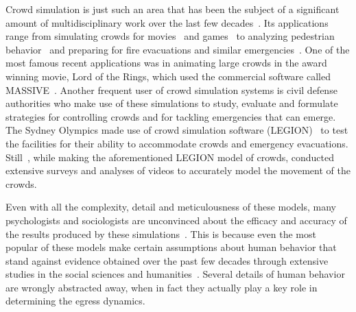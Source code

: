 Crowd simulation is just such an area that has been the subject of a significant amount of multidisciplinary work over the last few decades~\cite{Still:2000tp,Zhou:2010:CMS:1842722.1842725,Gwynne1999741}. Its applications range from simulating crowds for movies~\cite{Regelous:2011vt,Reynolds:1987vm} and games~\cite{Snape:2012,ageOfEmpires:2013} to analyzing pedestrian behavior~\cite{PhysRevE.51.4282,Viswanathan:ut,Guy:2010uv} and preparing for fire evacuations and similar emergencies~\cite{Klupfel:2005to,PEDFull:2011,Mordvintsev:2012}. One of the most famous recent applications was in animating large crowds in the award winning movie, Lord of the Rings, which used the commercial software called MASSIVE~\cite{Regelous:2011vt}. Another frequent user of crowd simulation systems is civil defense authorities who make use of these simulations to study, evaluate and formulate strategies for controlling crowds and for tackling emergencies that can emerge. The Sydney Olympics made use of crowd simulation software (LEGION)~\cite{Still:2000tp} to test the facilities for their ability to accommodate crowds and emergency evacuations. Still~\cite{Still:2000tp}, while making the aforementioned LEGION model of crowds, conducted extensive surveys and analyses of videos to accurately model the movement of the crowds.

Even with all the complexity, detail and meticulousness of these models, many psychologists and sociologists are unconvinced about the efficacy and accuracy of the results produced by these simulations~\cite{Aguirre:2004tn,Torres:2010tj,Sime:1995uu}. This is because even the most popular of these models make certain assumptions about human behavior that stand against evidence obtained over the past few decades through extensive studies in the social sciences and humanities~\cite{Torres:2010tj,Sime:1995uu}. Several details of human behavior are wrongly abstracted away, when in fact they actually play a key role in determining the egress dynamics.


